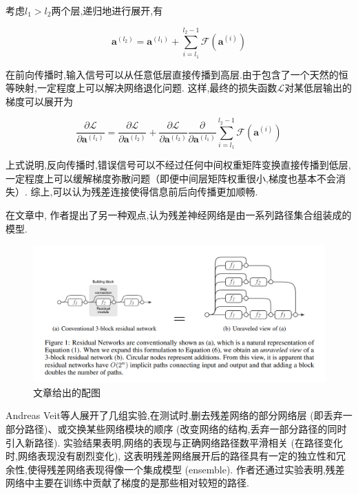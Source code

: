 考虑$l_1>l_2$两个层,递归地进行展开,有

\begin{equation}
	\mathbf{a}^{\left(l_{2}\right)}=\mathbf{a}^{\left(l_{1}\right)}+\sum_{i=l_{1}}^{l_{2}-1} \mathcal{F}\left(\mathbf{a}^{(i)}\right)
\end{equation}

在前向传播时,输入信号可以从任意低层直接传播到高层.由于包含了一个天然的恒等映射,一定程度上可以解决网络退化问题.
这样,最终的损失函数$\mathcal{L}$对某低层输出的梯度可以展开为

\begin{equation}
	\frac{\partial \mathcal{L}}{\partial \mathbf{a}^{\left(l_{1}\right)}}=\frac{\partial \mathcal{L}}{\partial \mathbf{a}^{\left(l_{2}\right)}}+\frac{\partial \mathcal{L}}{\partial \mathbf{a}^{\left(l_{2}\right)}} \frac{\partial}{\partial \mathbf{a}^{\left(l_{1}\right)}} \sum_{i=l_{1}}^{l_{2}-1} \mathcal{F}\left(\mathbf{a}^{(i)}\right)
\end{equation}

上式说明,反向传播时,错误信号可以不经过任何中间权重矩阵变换直接传播到低层,
一定程度上可以缓解梯度弥散问题（即便中间层矩阵权重很小,梯度也基本不会消失）.
综上,可以认为残差连接使得信息前后向传播更加顺畅.

在文章\cite{ResidualNetworksAreExponentialEnsembles}中,
作者提出了另一种观点,认为残差神经网络是由一系列路径集合组装成的模型.

\begin{figure}[htbp]
	\centering
	\includegraphics[scale=0.55]{figures/ResNet集成神经网络解释.png}
	\caption{文章给出的配图}
\end{figure}


Andreas Veit等人展开了几组实验,在测试时,删去残差网络的部分网络层
 (即丢弃一部分路径)、或交换某些网络模块的顺序 (改变网络的结构,丢弃一部分路径的同时引入新路径).
实验结果表明,网络的表现与正确网络路径数平滑相关 (在路径变化时,网络表现没有剧烈变化),
这表明残差网络展开后的路径具有一定的独立性和冗余性,使得残差网络表现得像一个集成模型 (ensemble).
作者还通过实验表明,残差网络中主要在训练中贡献了梯度的是那些相对较短的路径.


